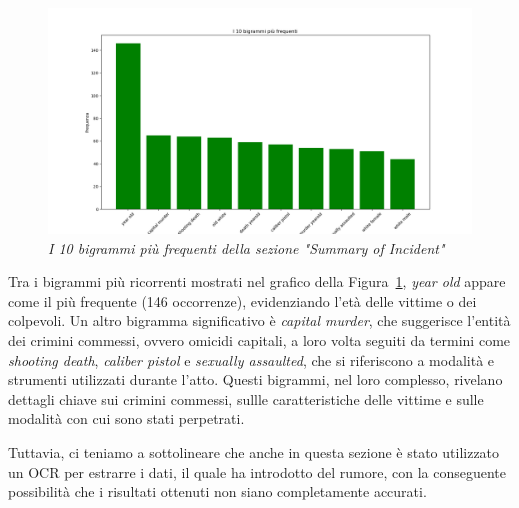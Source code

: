 \documentclass[11pt]{article}
\begin{document}
\begin{itemize}
        \begin{figure}
            \centering
            \includegraphics[width=1\linewidth]{summary_grafico_bigrammi.png}
            \caption{\textit{I 10 bigrammi più frequenti della sezione "Summary of Incident"}}
            \label{fig:summary_bigrammifrequenti}
        \end{figure}

        Tra i bigrammi più ricorrenti mostrati nel grafico della Figura~\ref{fig:summary_bigrammifrequenti}, \textit{year old} appare come il più frequente (146 occorrenze), evidenziando l'età delle vittime o dei colpevoli. Un altro bigramma significativo è \textit{capital murder}, che suggerisce l’entità dei crimini commessi, ovvero omicidi capitali, a loro volta seguiti da termini come \textit{shooting death}, \textit{caliber pistol} e \textit{sexually assaulted}, che si riferiscono a modalità e strumenti utilizzati durante l'atto. Questi bigrammi, nel loro complesso, rivelano dettagli chiave sui crimini commessi, sullle caratteristiche delle vittime e sulle modalità con cui sono stati perpetrati.
        
        Tuttavia, ci teniamo a sottolineare che anche in questa sezione è stato utilizzato un OCR per estrarre i dati, il quale ha introdotto del rumore, con la conseguente possibilità che i risultati ottenuti non siano completamente accurati. 
      
\end{itemize}
\end{document}
